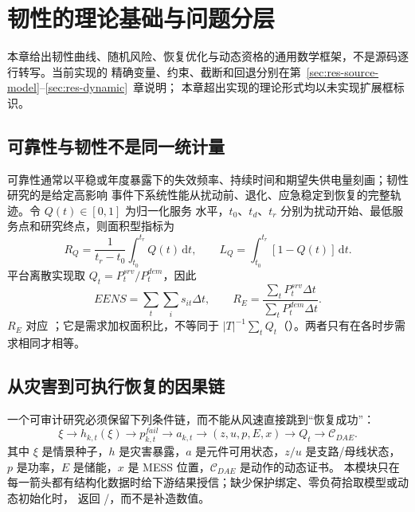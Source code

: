 \section{韧性的理论基础与问题分层}\label{sec:res-theory}

\begin{theorynote}
本章给出韧性曲线、随机风险、恢复优化与动态资格的通用数学框架，不是源码逐行转写。当前实现的
精确变量、约束、截断和回退分别在第~\ref{sec:res-source-model}--\ref{sec:res-dynamic}~章说明；
本章超出实现的理论形式均以未实现扩展框标识。
\end{theorynote}

\subsection{可靠性与韧性不是同一统计量}
可靠性通常以平稳或年度暴露下的失效频率、持续时间和期望失供电量刻画；韧性研究的是给定高影响
事件下系统性能从扰动前、退化、应急稳定到恢复的完整轨迹。令 $Q(t)\in[0,1]$ 为归一化服务
水平，$t_0$、$t_d$、$t_r$ 分别为扰动开始、最低服务点和研究终点，则面积型指标为
\begin{equation}
 R_Q=\frac{1}{t_r-t_0}\int_{t_0}^{t_r}Q(t)\,\mathrm dt,
 \qquad
 L_Q=\int_{t_0}^{t_r}[1-Q(t)]\,\mathrm dt .
\end{equation}
平台离散实现取 $Q_t=P_t^{srv}/P_t^{dem}$，因此
\begin{equation}
 EENS=\sum_t\sum_i s_{it}\Delta t,
 \qquad
 R_E=\frac{\sum_t P_t^{srv}\Delta t}
              {\sum_t P_t^{dem}\Delta t}.
\end{equation}
$R_E$ 对应 ；它是需求加权面积比，不等同于
$|T|^{-1}\sum_tQ_t$（）。两者只有在各时步需求相同才相等。

\subsection{从灾害到可执行恢复的因果链}
一个可审计研究必须保留下列条件链，而不能从风速直接跳到“恢复成功”：
\begin{equation}
 \xi\longrightarrow h_{k,t}(\xi)\longrightarrow
 p_{k,t}^{fail}\longrightarrow a_{k,t}\longrightarrow
 (z,u,p,E,x)\longrightarrow Q_t\longrightarrow
 \mathcal C_{DAE}.
\end{equation}
其中 $\xi$ 是情景种子，$h$ 是灾害暴露，$a$ 是元件可用状态，$z/u$ 是支路/母线状态，
$p$ 是功率，$E$ 是储能，$x$ 是 MESS 位置，$\mathcal C_{DAE}$ 是动作的动态证书。
本模块只在每一箭头都有结构化数据时给下游结果授信；缺少保护绑定、零负荷拾取模型或动态初始化时，
返回 /，而不是补造数值。

